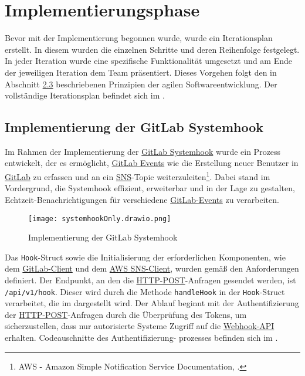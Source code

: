 \section{Implementierungsphase} 
\label{sec:Implementierungsphase}

Bevor mit der Implementierung begonnen wurde, wurde ein Iterationsplan erstellt. In diesem wurden die einzelnen Schritte und deren Reihenfolge festgelegt. In jeder Iteration wurde eine spezifische Funktionalität umgesetzt und am Ende der jeweiligen Iteration dem Team präsentiert. Dieses Vorgehen folgt den in Abschnitt \hyperlink{agil}{2.3} beschriebenen Prinzipien der agilen Softwareentwicklung. Der vollständige Iterationsplan befindet sich im .

\subsection{Implementierung der GitLab Systemhook}
\label{sec:ImplementierungGitlabSystemhook}

Im Rahmen der Implementierung der \hyperlink{GitLab}{\textcolor{AOBlau}{GitLab Systemhook}} wurde ein Prozess entwickelt, der es ermöglicht, \hyperlink{GitLabEvent}{\textcolor{AOBlau}{GitLab Events}} wie die Erstellung neuer Benutzer in \hyperlink{GitLab}{\textcolor{AOBlau}{GitLab}} zu erfassen und an ein \hyperlink{SNS}{\textcolor{AOBlau}{SNS}}-Topic weiterzuleiten\footnote{AWS - Amazon Simple Notification Service Documentation, \cite{aws2023sns}.}. Dabei stand im Vordergrund, die Systemhook effizient, erweiterbar und in der Lage zu gestalten, Echtzeit-Benachrichtigungen für verschiedene \hyperlink{GitLabEvent}{\textcolor{AOBlau}{GitLab-Events}} zu verarbeiten.

\begin{figure}[htb]
    \centering
    \texttt{[image: systemhookOnly.drawio.png]}
    \caption{Implementierung der GitLab Systemhook}
\end{figure}

Das \texttt{Hook}-Struct sowie die Initialisierung der erforderlichen Komponenten, wie dem \hyperlink{GitLabClient}{\textcolor{AOBlau}{GitLab-Client}} und dem \hyperlink{SNSClient}{\textcolor{AOBlau}{AWS SNS-Client}}, wurden gemäß den Anforderungen definiert. Der Endpunkt, an den die \hyperlink{HTTPPOST}{\textcolor{AOBlau}{HTTP-POST}}-Anfragen gesendet werden, ist \texttt{/api/v1/hook}. Dieser wird durch die Methode \texttt{handleHook} in der \texttt{Hook}-Struct verarbeitet, die im  dargestellt wird. Der Ablauf beginnt mit der Authentifizierung der \hyperlink{HTTP}{\textcolor{AOBlau}{HTTP-POST}}-Anfragen durch die Überprüfung des Tokens, um sicherzustellen, dass nur autorisierte Systeme Zugriff auf die \hyperlink{API}{\textcolor{AOBlau}{Webhook-API}} erhalten. Codeauschnitte des Authentifizierung- prozesses befinden sich im .

